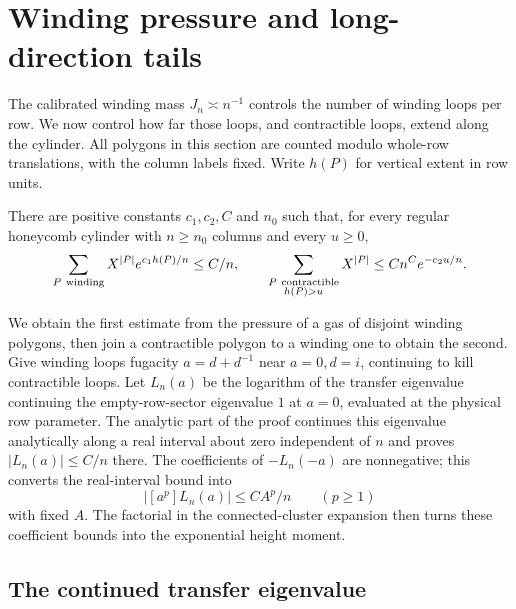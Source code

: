 \section{Winding pressure and long-direction tails}\label{L:part5}

The calibrated winding mass $J_n\asymp n^{-1}$ controls the number of
winding loops per row. We now control how far those loops, and
contractible loops, extend along the cylinder. All polygons in this
section are counted modulo whole-row translations, with the column
labels fixed. Write $h(P)$ for vertical extent in row units.

\begin{proposition}
\label{L:prop:cylinder-height-tail}
There are positive constants $c_1,c_2,C$ and $n_0$ such that, for every
regular honeycomb cylinder with $n\ge n_0$ columns and every $u\ge0$,
\begin{equation}\label{L:eq:cylinder-height-tail}
 \sum_{P\ {\rm winding}} X^{|P|}e^{c_1h(P)/n}\le C/n,
 \qquad
 \sum_{\substack{P\ {\rm contractible}\\h(P)>u}}X^{|P|}
       \le C n^C e^{-c_2u/n}.
\end{equation}
\end{proposition}

We obtain the first estimate from the pressure of a gas of disjoint
winding polygons, then join a contractible polygon to a winding one to
obtain the second. Give winding loops fugacity $a=d+d^{-1}$ near
$a=0,d=i$, continuing to kill contractible loops. Let $L_n(a)$ be the
logarithm of the transfer eigenvalue continuing the empty-row-sector
eigenvalue $1$ at $a=0$, evaluated at the physical row parameter.
The analytic part of the proof continues this eigenvalue analytically
along a real interval about zero independent of $n$ and proves
$|L_n(a)|\le C/n$ there. The coefficients of $-L_n(-a)$ are
nonnegative; this converts the real-interval bound into
\[
 |[a^p]L_n(a)|\le C A^p/n \qquad(p\ge1)
\]
with fixed $A$. The factorial in the connected-cluster expansion then
turns these coefficient bounds into the exponential height moment.

\subsection{The continued transfer eigenvalue}

